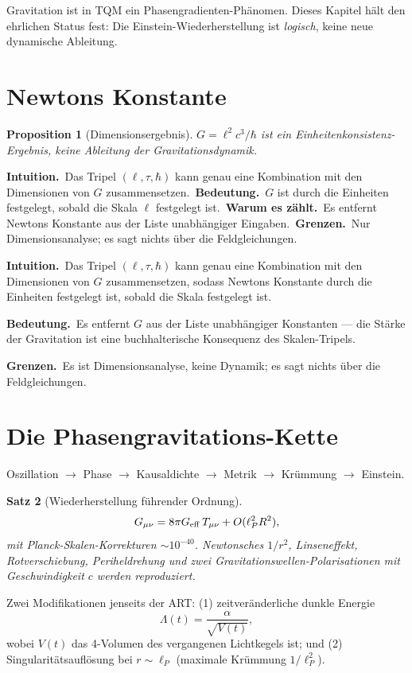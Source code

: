 \documentclass[10pt,twoside,openany]{book}
\newtheorem{theorem}{Satz}[chapter]
\newtheorem{proposition}[theorem]{Proposition}
\newcommand{\theoremnotes}[3]{%
  \par\medskip\noindent
  \textbf{Intuition.}\ #1\par
  \textbf{Bedeutung.}\ #2\par
  \textbf{Grenzen.}\ #3\par}
\newcommand{\eqnotes}[4]{%
  \par\smallskip\noindent
  \textbf{Intuition.}\ #1\ 
  \textbf{Bedeutung.}\ #2\ 
  \textbf{Warum es zählt.}\ #3\ 
  \textbf{Grenzen.}\ #4\par}
\begin{document}
Gravitation ist in TQM ein Phasengradienten-Phänomen. Dieses Kapitel hält den ehrlichen
Status fest: Die Einstein-Wiederherstellung ist \emph{logisch}, keine neue dynamische
Ableitung.

\section{Newtons Konstante}

\begin{proposition}[Dimensionsergebnis]
$G = \ell^2 c^3/\hbar$ ist ein \emph{Einheitenkonsistenz}-Ergebnis, keine Ableitung der
Gravitationsdynamik.
\end{proposition}

\eqnotes
{Das Tripel $(\ell,\tau,\hbar)$ kann genau eine Kombination mit den Dimensionen von $G$
zusammensetzen.}
{$G$ ist durch die Einheiten festgelegt, sobald die Skala $\ell$ festgelegt ist.}
{Es entfernt Newtons Konstante aus der Liste unabhängiger Eingaben.}
{Nur Dimensionsanalyse; es sagt nichts über die Feldgleichungen.}

\theoremnotes
{Das Tripel $(\ell,\tau,\hbar)$ kann genau eine Kombination mit den Dimensionen von $G$
zusammensetzen, sodass Newtons Konstante durch die Einheiten festgelegt ist, sobald die
Skala festgelegt ist.}
{Es entfernt $G$ aus der Liste unabhängiger Konstanten --- die Stärke der Gravitation ist
eine buchhalterische Konsequenz des Skalen-Tripels.}
{Es ist Dimensionsanalyse, keine Dynamik; es sagt nichts über die Feldgleichungen.}

\section{Die Phasengravitations-Kette}

Oszillation $\to$ Phase $\to$ Kausaldichte $\to$ Metrik $\to$ Krümmung $\to$ Einstein.

\begin{theorem}[Wiederherstellung führender Ordnung]
\begin{equation}
G_{\mu\nu} = 8\pi G_{\rm eff}\, T_{\mu\nu} + O(\ell_P^2 R^2),
\end{equation}
mit Planck-Skalen-Korrekturen $\sim10^{-40}$. Newtonsches $1/r^2$, Linseneffekt,
Rotverschiebung, Periheldrehung und zwei Gravitationswellen-Polarisationen mit
Geschwindigkeit $c$ werden reproduziert.
\end{theorem}

Zwei Modifikationen jenseits der ART: (1) zeitveränderliche dunkle Energie
\begin{equation}
\Lambda(t) = \frac{\alpha}{\sqrt{V(t)}},
\end{equation}
wobei $V(t)$ das 4-Volumen des vergangenen Lichtkegels ist; und (2)
Singularitätsauflösung bei $r\sim\ell_P$ (maximale Krümmung $1/\ell_P^2$).
\end{document}
